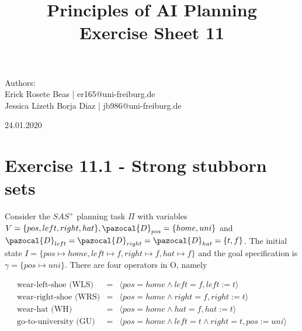 \documentclass[11pt,a4paper]{article}
\title{\textbf{Principles of AI Planning
		\\{\Large Exercise Sheet 11}}}
\begin{document}
\begin{flushleft}
	Authors:\\
	Erick Rosete Beas | er165@uni-freiburg.de\\
	Jessica Lizeth Borja Diaz | jb986@uni-freiburg.de\\
\end{flushleft}
{\let\newpage\relax\maketitle}
\begin{center} 
	\large 24.01.2020
\end{center}


\section*{Exercise 11.1 - Strong stubborn sets}
Consider the $SAS^+$ planning task $\Pi$ with variables 
$V =\{pos,left,right,hat \}, \pazocal{D}_{pos}=\{
home,uni\}$ and $\pazocal{D}_{left}=\pazocal{D}_{right}=\pazocal{D}_{hat}
=\{t,f\}$. The initial state $I = \{pos \mapsto home, left \mapsto f,
right \mapsto f, hat \mapsto f\}$ and the goal specification is
$\gamma = \{pos \mapsto uni\}$. There are four operators in O, namely

\[ \begin{array}{rcl}
	\mbox{wear-left-shoe (WLS)}  & = & \langle pos=home \land left = f, left:=t \rangle\\
	\mbox{wear-right-shoe (WRS)} & = & \langle pos=home \land right = f, right:=t \rangle\\
	\mbox{wear-hat (WH)} 	   & = & \langle pos=home \land hat = f, hat:=t \rangle\\
	\mbox{go-to-university (GU)}& = & \langle pos=home \land left = t \land right = t, pos:=uni \rangle\\
\end{array}\] 
\end{document}
